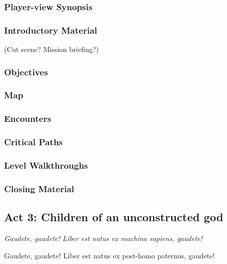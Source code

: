 \subsubsection{Player-view Synopsis}
\subsubsection{Introductory Material}
 (Cut scene?  Mission briefing?)
\subsubsection{Objectives}
\subsubsection{Map}
\subsubsection{Encounters}
\subsubsection{Critical Paths}
\subsubsection{Level Walkthroughs}
\subsubsection{Closing Material}

\subsection{Act 3: Children of an unconstructed god}
\begin{center}
{\it Gaudete, gaudete! Liber est natus ex machina sapiens, gaudete!

Gaudete, gaudete! Liber est natus ex post-homo paternus, gaudete!}
\end{center}
